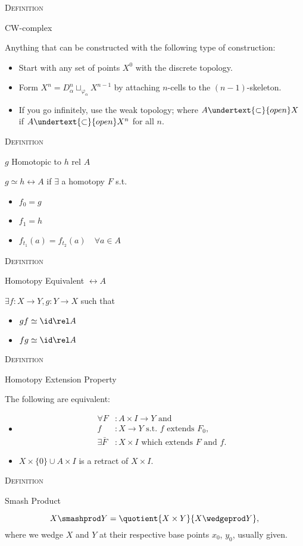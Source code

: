 \documentclass{article}
\newenvironment{flashcard}[2][]{%
\noindent  \textsc{#1}

\vfill 
\centerline{{\Large{#2}}}
\vfill
\newpage \vspace*{\stretch{1}} \noindent
}
{\vspace*{\stretch{1}}\newpage}
\begin{document}
\begin{flashcard}[Definition]{CW-complex}
Anything that can be constructed with the following type of construction: 
\begin{itemize}
\item Start with any set of points $X^0$ with the discrete topology. 
\item Form $X^n= D^n_\alpha \sqcup_{\varphi_\alpha} X^{n-1}$ by attaching $n$-cells to the $(n-1)$-skeleton. 
\item If you go infinitely, use the weak topology; where $A{\undertext{\subset}{open}}{X}$ if $A{\undertext{\subset}{open}}{X^n}$ for all $n$. 
\end{itemize}
\end{flashcard}

\begin{flashcard}[Definition]{$g$ Homotopic to $h$ rel $A$}
$g\simeq h \rel A$ if $\exists$ a homotopy $F$ s.t. 
\begin{itemize}
\item $f_0 = g$
\item $f_1 = h$ 
\item $f_{t_1}(a)=f_{t_2}(a) \quad \forall a\in A$
\end{itemize}
\end{flashcard}

\begin{flashcard}[Definition]{Homotopy Equivalent $\rel A$}
$\exists f:X\to Y, g:Y\to X$ such that 
\begin{itemize}
\item $gf\simeq\id \rel A$
\item $fg\simeq\id \rel A$
\end{itemize}
\end{flashcard}

\begin{flashcard}[Definition]{Homotopy Extension Property}
The following are equivalent:
\begin{itemize}
\item \mbox{} \vspace*{-5ex}\begin{align*}
\forall F&:A\times I \to Y \text{ and }\\
f&: X \to Y \text{ s.t. } f \text{ extends } F_0,\\
\exists \bar{F}&: X\times I \text{ which extends } F \text{ and }f.
\end{align*}

\item $X\times \{0\} \cup A\times I$ is a retract of $X\times I$. 
\end{itemize}
\end{flashcard}

\begin{flashcard}[Definition]{Smash Product}
$$X \smashprod Y = \quotient{X\times Y}{X\wedgeprod Y},$$
where we wedge $X$ and $Y$ at their respective base points $x_0$, $y_0$, usually given. 
\end{flashcard}
\end{document}
